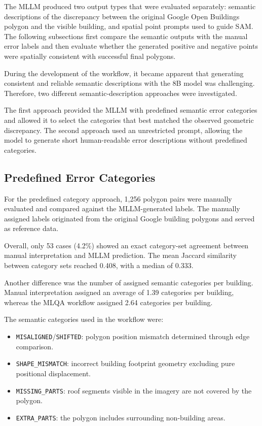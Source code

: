 The MLLM produced two output types that were evaluated separately: semantic descriptions of the discrepancy between the original Google Open Buildings polygon and the visible building, and spatial point prompts used to guide SAM. The following subsections first compare the semantic outputs with the manual error labels and then evaluate whether the generated positive and negative points were spatially consistent with successful final polygons.

During the development of the workflow, it became apparent that generating consistent and reliable semantic descriptions with the 8B model was challenging. Therefore, two different semantic-description approaches were investigated.

The first approach provided the MLLM with predefined semantic error categories and allowed it to select the categories that best matched the observed geometric discrepancy. The second approach used an unrestricted prompt, allowing the model to generate short human-readable error descriptions without predefined categories.

\subsection{Predefined Error Categories}
\label{sec:results_predefined_error_categories}
For the predefined category approach, 1,256 polygon pairs were manually evaluated and compared against the MLLM-generated labels. The manually assigned labels originated from the original Google building polygons and served as reference data.

Overall, only 53 cases (4.2\%) showed an exact category-set agreement between manual interpretation and MLLM prediction. The mean Jaccard similarity between category sets reached 0.408, with a median of 0.333.

Another difference was the number of assigned semantic categories per building. Manual interpretation assigned an average of 1.39 categories per building, whereas the MLQA workflow assigned 2.64 categories per building. 

The semantic categories used in the workflow were:

\begin{itemize}
\item \texttt{MISALIGNED}/\texttt{SHIFTED}: polygon position mismatch determined through edge comparison.
\item \texttt{SHAPE\_MISMATCH}: incorrect building footprint geometry excluding pure positional displacement.
\item \texttt{MISSING\_PARTS}: roof segments visible in the imagery are not covered by the polygon.
\item \texttt{EXTRA\_PARTS}: the polygon includes surrounding non-building areas.

\end{itemize}


